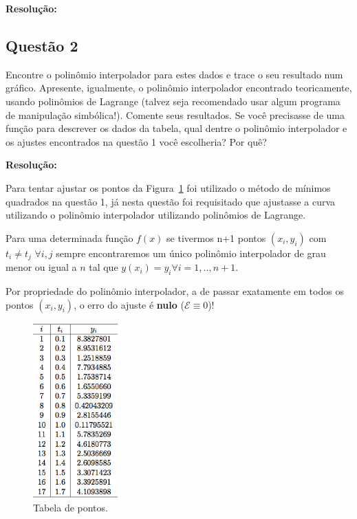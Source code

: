 \documentclass[12pt]{article}
\begin{document}
\textbf{Resolução:}


\subsection{Questão 2}
\label{subsec:p1q2}

Encontre o polinômio interpolador para estes dados e trace o seu resultado num gráfico. Apresente, igualmente, o polinômio interpolador encontrado teoricamente, usando polinômios de Lagrange (talvez seja recomendado usar algum programa de manipulação simbólica!). Comente seus resultados. Se você precisasse de uma função para descrever os dados da tabela, qual dentre o polinômio interpolador e os ajustes encontrados na questão 1 você escolheria? Por quê?

\textbf{Resolução:}

Para tentar ajustar os pontos da Figura~\ref{fig:tab1} foi utilizado o método de mínimos quadrados na questão 1, já nesta questão foi requisitado que ajustasse a curva utilizando o polinômio interpolador utilizando polinômios de Lagrange.

Para uma determinada função $f(x)$ se tivermos n+1 pontos $(x_{i}, y_{i})$ com $t_{i} \neq t_{j}$ $\forall i,j$ sempre encontraremos um único polinômio interpolador de grau menor ou igual a $n$ tal que $y(x_{i}) = y_{i} \forall i=1,..,n+1$.

Por propriedade do polinômio interpolador, a de passar exatamente em todos os pontos $(x_{i}, y_{i})$, o erro do ajuste é \textbf{nulo} ($\mathcal{E}\equiv 0$)! 

\begin{figure}[H]
	\centering
	\includegraphics[width=0.3\textwidth]{tab1.png}
	\caption{Tabela de pontos.}
	\label{fig:tab1}
\end{figure}
\end{document}
